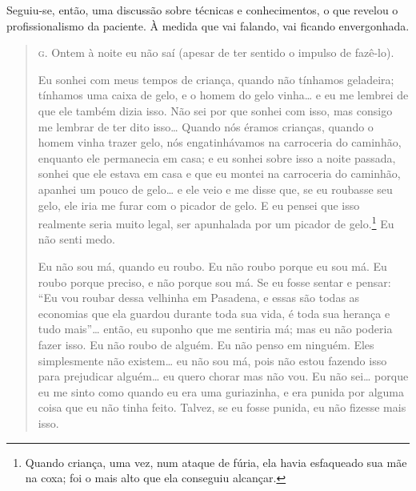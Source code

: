 \bigskip

Seguiu-se, então, uma discussão sobre técnicas e conhecimentos, o
que revelou o profissionalismo da paciente. À medida que vai falando,
vai ficando envergonhada.

\bigskip

\begin{quote}

\noindent\hskip0mm\textsc{g.} Ontem à noite eu não saí (apesar de ter sentido o impulso de
fazê-lo).

 Eu sonhei com meus tempos de criança, quando não tínhamos geladeira;
tínhamos uma caixa de gelo, e o homem do gelo vinha\ldots{} e eu me lembrei
de que ele também dizia isso. Não sei por que sonhei com isso, mas
consigo me lembrar de ter dito isso\ldots{} Quando nós éramos crianças,
quando o homem vinha trazer gelo, nós engatinhávamos na carroceria do
caminhão, enquanto ele permanecia em casa; e eu sonhei sobre isso a
noite passada, sonhei que ele estava em casa e que eu montei na
carroceria do caminhão, apanhei um pouco de gelo\ldots{} e ele veio e me
disse que, se eu roubasse seu gelo, ele iria me furar com o picador de
gelo. E eu pensei que isso realmente seria muito legal, ser apunhalada
por um picador de gelo.\footnote{ Quando criança, uma vez, num ataque
de fúria, ela havia esfaqueado sua mãe na coxa; foi o mais alto que ela
conseguiu alcançar.} Eu não senti medo.

Eu não sou má, quando eu roubo. Eu não roubo porque eu sou má. Eu
roubo porque preciso, e não porque sou má. Se eu fosse sentar e pensar:
``Eu vou roubar dessa velhinha em Pasadena, e essas são
todas as economias que ela guardou durante toda sua vida, é toda sua
herança e tudo mais''\ldots{} então, eu suponho que me sentiria
má; mas eu não poderia fazer isso. Eu não roubo de alguém. Eu não penso
em ninguém. Eles simplesmente não existem\ldots{} eu não sou má, pois não
estou fazendo isso para prejudicar alguém\ldots{} eu quero chorar mas não
vou. Eu não sei\ldots{} porque eu me sinto como quando eu era uma
guriazinha, e era punida por alguma coisa que eu não tinha feito.
Talvez, se eu fosse punida, eu não fizesse mais isso.


\end{quote}
